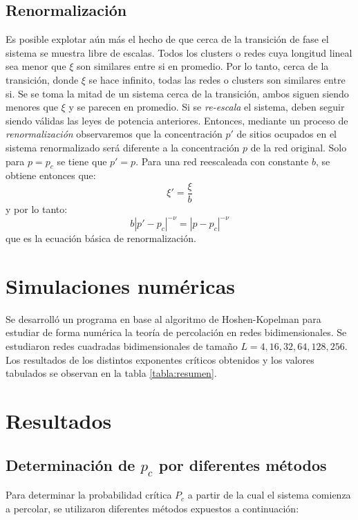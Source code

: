 \documentclass[%
 reprint,
 amsmath,amssymb,
 aps,
spanish]{revtex4-1}
\begin{document}
\subsection{\label{renorm}Renormalizaci\'on}
Es posible explotar a\'un m\'as el hecho de que cerca de la transici\'on de fase el sistema se muestra libre de escalas. Todos los clusters o redes cuya longitud lineal sea menor que $\xi$ son similares entre si en promedio. Por lo tanto, cerca de la transición, donde $\xi$ se hace infinito, todas las redes o clusters son similares entre si. Se se toma la mitad de un sistema cerca de la transición, ambos siguen siendo menores que $\xi$ y se parecen en promedio. Si se \emph{re-escala} el sistema, deben seguir siendo v\'alidas las leyes de potencia anteriores.
Entonces, mediante un proceso de \emph{renormalizaci\'on} observaremos que la concentración $p'$ de sitios ocupados en el sistema renormalizado será diferente a la concentración $p$ de la red original. Solo para $p=p_c$ se tiene que $p'=p$. Para una red reescaleada con constante $b$, se obtiene entonces que:
\begin{equation}
\label{ecu:masa}
\xi'=\frac{\xi}{b}
\end{equation} 
y por lo tanto:
\begin{equation}
\label{ecu:masa}
b|p'-p_c|^{-\nu}=|p-p_c|^{-\nu}
\end{equation} 
que es la ecuación básica de renormalización.

\section{\label{simulations}Simulaciones num\'ericas}
Se desarrolló un programa en base al algoritmo de Hoshen-Kopelman para estudiar de forma numérica la teoría de percolación en redes bidimensionales.\cite{Kopelman}
Se estudiaron redes cuadradas bidimensionales de tamaño $L=4, 16, 32, 64, 128, 256$. Los resultados de los distintos exponentes críticos obtenidos y los valores tabulados se observan en la tabla \ref{tabla:resumen}.

\section{\label{results}Resultados}

\subsection{\label{p_c} Determinaci\'on de $p_c$ por diferentes m\'etodos}
Para determinar la probabilidad crítica $P_c$ a partir de la cual el sistema comienza a percolar, se utilizaron diferentes métodos expuestos a continuación:
\end{document}
